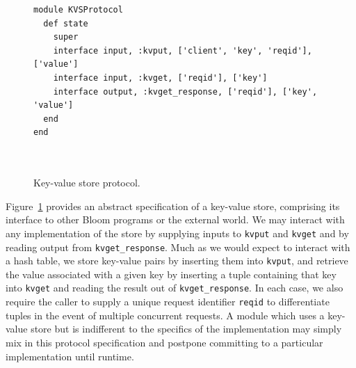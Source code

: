 \begin{figure}[t]
\begin{scriptsize}
\begin{lstlisting}
module KVSProtocol
  def state
    super
    interface input, :kvput, ['client', 'key', 'reqid'], ['value']
    interface input, :kvget, ['reqid'], ['key']
    interface output, :kvget_response, ['reqid'], ['key', 'value']
  end
end



\end{lstlisting}
\centering
\vspace{-10pt}
\caption{Key-value store protocol.}
\label{fig:kvs-proto}
\end{scriptsize}
\vspace{-2pt}
\end{figure}

Figure~\ref{fig:kvs-proto} provides an abstract specification of a key-value store,
comprising its interface to other Bloom programs or the external world.  
We may interact with any implementation of the store
by supplying inputs to \texttt{kvput} and \texttt{kvget} and by reading output from
\texttt{kvget\_response}.  
Much as we would expect to interact
with a hash table, we store key-value pairs by inserting them into \texttt{kvput}, and 
retrieve the value associated with a given key by inserting a tuple containing that key
into \texttt{kvget} and reading the result out of \texttt{kvget\_response}.  In each case,
we also require the caller to supply a unique request identifier \texttt{reqid} to differentiate
tuples in the event of multiple concurrent requests.
A module which uses a key-value store but is indifferent
to the specifics of the implementation may simply mix in this protocol specification
and postpone committing to a particular implementation until runtime.

